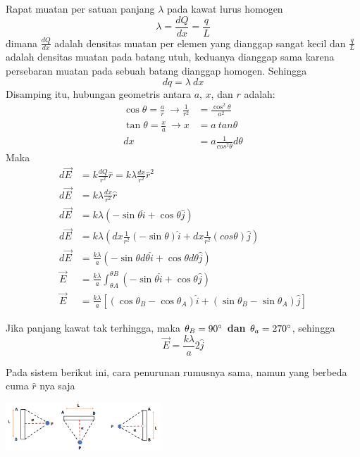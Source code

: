 \documentclass[twocolumn, 11pt]{article}%
\begin{document}
    Rapat muatan per satuan panjang $\lambda$ pada kawat lurus homogen
    \[ \lambda = \frac{dQ}{dx} = \frac{q}L \]
    dimana $\frac{dQ}{dx}$ adalah densitas muatan per elemen yang dianggap sangat kecil dan $\frac{q}L$ adalah densitas muatan pada batang utuh, keduanya dianggap sama karena persebaran muatan pada sebuah batang dianggap homogen. Sehingga
    \[ dq =  \lambda\ dx \]
    Disamping itu, hubungan geometris antara $a$, $x$, dan $r$ adalah:
    \begin{align*}
        \cos \theta = \frac{a}r\ \rightarrow \frac1{r^2} &= \frac{\cos^2 \theta}{a^2}\\
        \tan \theta = \frac{x}a\ \rightarrow x&=a\ tan \theta\\
        dx &= a \frac1{cos^2 \theta} d\theta
    \end{align*}
    Maka
    \begin{align*}
        d \vec E &= k \frac{dQ}{r^2} \hat r= k \lambda \frac{dx}{r^2} \hat r^2\\       
        d \vec E &= k \lambda \frac{dx}{r^2} \hat r\\
        d \vec E &= k \lambda  (-\sin \theta \hat i + \cos \theta \hat j)\\
        d \vec E &= k \lambda  (dx \frac1{r^2} (-\sin \theta)\hat i + dx \frac1{r^2}(cos \theta) \hat j)\\
        d \vec E &= \frac{k \lambda}a (-\sin \theta d\theta \hat i +\cos \theta d\theta \hat j)\\
        \vec E &= \frac{k \lambda}a \int_{\theta A}^{\theta B} (-\sin \theta \hat i + \cos \theta \hat j)\\
        \vec E &= \frac{k \lambda}a [(\cos \theta_B - \cos \theta_A) \hat i + (\sin \theta_B - \sin \theta_A) \hat j ]
    \end{align*}

    Jika panjang kawat tak terhingga, maka \textbf{$\theta_B = 90 \degree$ dan $\theta_a=270 \degree$}, sehingga
    \[ \vec E = \frac{k \lambda}a 2 \hat j \]
    
    Pada sistem berikut ini, cara penurunan rumusnya sama, namun yang berbeda cuma $\hat r$ nya saja
    \begin{center}
        \includegraphics[width=220px]{11.png}
    \end{center}
    
\end{document}
